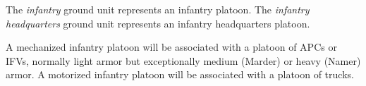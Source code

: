 
The \emph{infantry} ground unit represents an infantry platoon. The \emph{infantry headquarters} ground unit represents an infantry headquarters platoon.




A mechanized infantry platoon will be associated with a platoon of APCs or IFVs, normally light armor but exceptionally medium (Marder) or heavy (Namer) armor. A motorized infantry platoon will be associated with a platoon of trucks.
